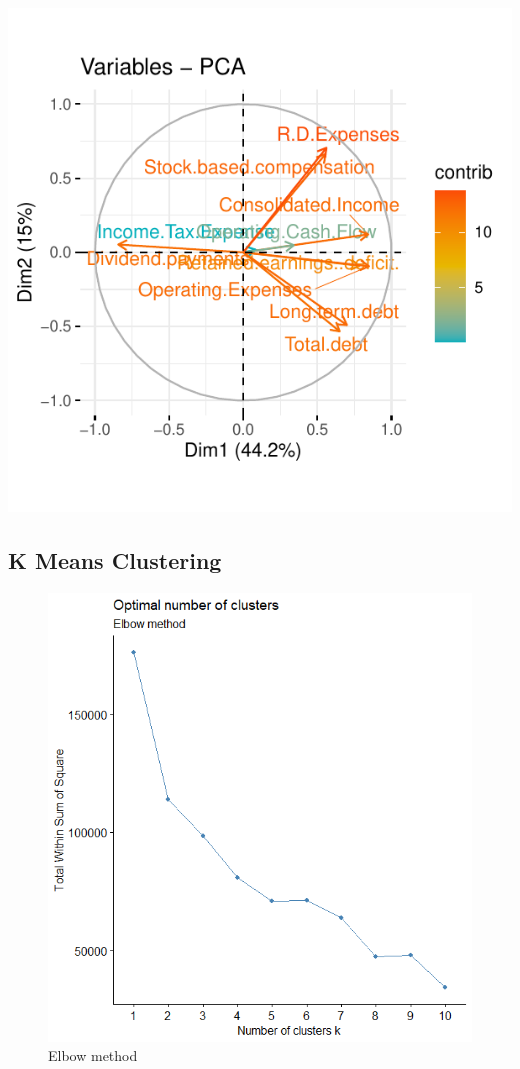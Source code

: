 \documentclass[11pt,]{article}
\begin{document}
\includegraphics{stock_analysis_files/figure-latex/PCAvar-1.pdf}

\hypertarget{k-means-clustering}{%
\subsection{K Means Clustering}\label{k-means-clustering}}

\begin{figure}
\includegraphics[width=1\linewidth,height=0.7\textheight]{unsupervised_elbow} \caption{Elbow method}\label{fig:elbow}
\end{figure}
\end{document}
